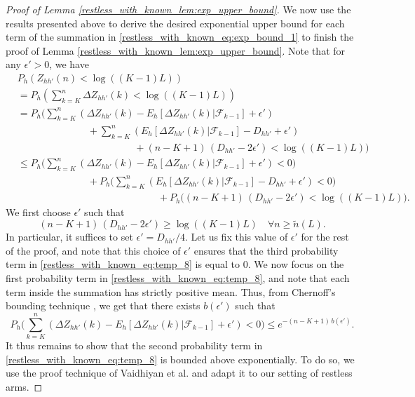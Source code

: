 \begin{proof}[Proof of Lemma \ref{restless_with_known_lem:exp_upper_bound}]
We now use the results presented above to derive the desired exponential upper bound for each term of the summation in \eqref{restless_with_known_eq:exp_bound_1} to finish the proof of Lemma \ref{restless_with_known_lem:exp_upper_bound}. 
Note that for any $\epsilon'>0$, we have
\begin{align}
	&P_h\left(Z_{hh'}(n)<\log((K-1)L)\right)\nonumber\\
	&=P_h\left(\sum\limits_{k=K}^{n}\Delta Z_{hh'}(k)<\log((K-1)L)\right)\nonumber\\
	&=P_h\bigg(\sum\limits_{k=K}^n(\Delta Z_{hh'}(k)-E_h[\Delta Z_{hh'}(k)|\mathcal{F}_{k-1}]+\epsilon')\nonumber\\
	&\hspace{3cm}+\sum\limits_{k=K}^n (E_h[\Delta Z_{hh'}(k)|\mathcal{F}_{k-1}]-D_{hh'}+\epsilon')\nonumber\\
	&\hspace{5cm}+(n-K+1)\,(D_{hh'}-2\epsilon')<\log((K-1)L)\bigg)\nonumber\\
	&\leq P_h\bigg(\sum\limits_{k=K}^n(\Delta Z_{hh'}(k)-E_h[\Delta Z_{hh'}(k)|\mathcal{F}_{k-1}]+\epsilon')<0\bigg)\nonumber\\
	&\hspace{3cm}+P_h\bigg(\sum\limits_{k=K}^n (E_h[\Delta Z_{hh'}(k)|\mathcal{F}_{k-1}]-D_{hh'}+\epsilon')<0\bigg)\nonumber\\
	&\hspace{6cm}+P_h\bigg((n-K+1)\,(D_{hh'}-2\epsilon')<\log((K-1)L)\bigg).\label{restless_with_known_eq:temp_8}
\end{align}
We first choose $\epsilon'$ such that $$(n-K+1)\,(D_{hh'}-2\epsilon')\geq \log((K-1)L)\quad \forall n\geq \tilde{n}(L).$$ {\color{black} In particular, it suffices to set $\epsilon'=D_{hh'}/4$}. Let us fix this value of $\epsilon'$ for the rest of the proof, and note that this choice of $\epsilon'$ ensures that the third probability term in \eqref{restless_with_known_eq:temp_8} is equal to $0$. We now focus on the first probability term in \eqref{restless_with_known_eq:temp_8}, and note that each term inside the summation has strictly positive mean. Thus, from Chernoff's bounding technique \cite[Lemma 2]{Chernoff1959}, we get that there exists $b(\epsilon')$ such that 
\begin{equation}
	P_h\bigg(\sum\limits_{k=K}^n(\Delta Z_{hh'}(k)-E_h[\Delta Z_{hh'}(k)|\mathcal{F}_{k-1}]+\epsilon')<0\bigg)\leq e^{-(n-K+1)\,b(\epsilon')}.
\end{equation}
It thus remains to show that the second probability term in \eqref{restless_with_known_eq:temp_8} is bounded above exponentially. To do so, we use the proof technique of Vaidhiyan et al. \cite[pp. 4793-4794]{Vaidhiyan2017} and adapt it to our setting of restless arms. 


\end{proof}
